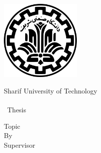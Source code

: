 \thispagestyle{empty}
\begin{center}
	\begin{latin}
		\includegraphics[width=0.3\textwidth]{./files/logo} \\
		\begin{Large}
		Sharif University of Technology \\
		\enDep \\ [1cm]
		\enlevel\ Thesis \\ [6mm]
		\enmajor
		\end{Large}
		\vskip 3cm
		\Large{Topic}      \\ \textbf{\Large{\entitle}}
		\vskip 1.3cm
		\large{By}         \\ \Large{\enAuthor}
		\vskip 2cm
		\large{Supervisor} \\ \Large{\ensupervisor}
		\vskip 1cm
		\large{\engdate}
	\end{latin}
\end{center}

